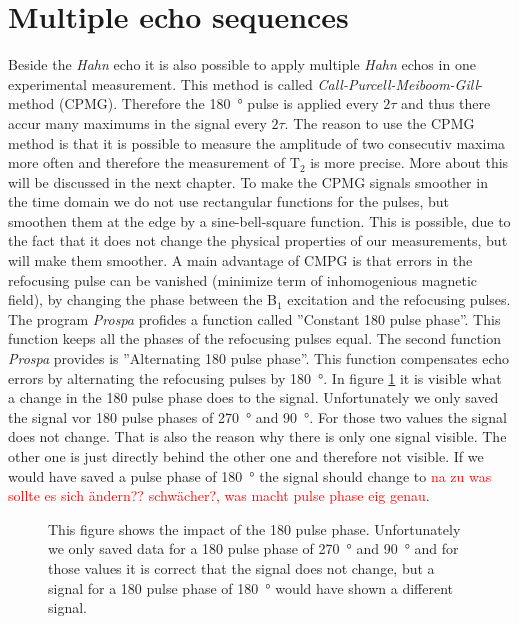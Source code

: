 \section{Multiple echo sequences}
\label{sec:Multipleechosequences}
Beside the \textit{Hahn} echo it is also possible to apply multiple \textit{Hahn} echos in one experimental measurement. This method is called \textit{Call-Purcell-Meiboom-Gill}-method (CPMG). Therefore the \SI{180}{\degree} pulse is applied every $2\tau$ and thus there accur many maximums in the signal every $2\tau$. The reason to use the CPMG method is that it is possible to measure the amplitude of two consecutiv maxima more often and therefore the measurement of T$_2$ is more precise. More about this will be discussed in the next chapter.\newline
To make the CPMG signals smoother in the time domain we do not use rectangular functions for the pulses, but smoothen them at the edge by a sine-bell-square function. This is possible, due to the fact that it does not change the physical properties of our measurements, but will make them smoother.\newline
A main advantage of CMPG is that errors in the refocusing pulse can be vanished (minimize term of inhomogenious magnetic field), by changing the phase between the B$_1$ excitation and the refocusing pulses. The program \textit{Prospa} profides a function called ''Constant 180 pulse phase''. This function keeps all the phases of the refocusing pulses equal. The second function \textit{Prospa} provides is ''Alternating 180 pulse phase''. This function compensates echo errors by alternating the refocusing pulses by \SI{180}{\degree}. In figure \ref{fig:180pulsephasedegree} it is visible what a change in the 180 pulse phase does to the signal. Unfortunately we only saved the signal vor 180 pulse phases of \SI{270}{\degree} and \SI{90}{\degree}. For those two values the signal does not change. That is also the reason why there is only one signal visible. The other one is just directly behind the other one and therefore not visible. If we would have saved a pulse phase of \SI{180}{\degree} the signal should change to \textcolor{red}{na zu was sollte es sich ändern?? schwächer?, was macht pulse phase eig genau}.

\begin{figure}[H]
    \centering
    
    \caption[This figure shows the impact of the 180 pulse phase.]{This figure shows the impact of the 180 pulse phase. Unfortunately we only saved data for a 180 pulse phase of \SI{270}{\degree} and \SI{90}{\degree} and for those values it is correct that the signal does not change, but a signal for a 180 pulse phase of \SI{180}{\degree} would have shown a different signal.}
    \label{fig:180pulsephasedegree}
\end{figure}
